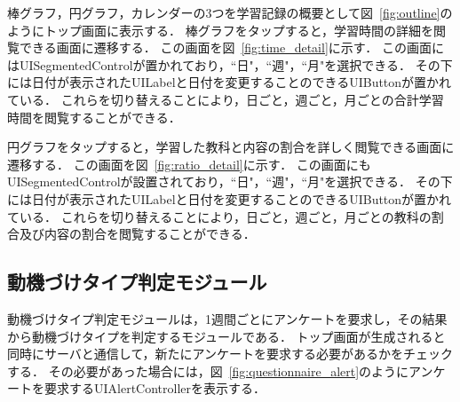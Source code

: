 棒グラフ，円グラフ，カレンダーの3つを学習記録の概要として図~\ref{fig:outline}のようにトップ画面に表示する．
棒グラフをタップすると，学習時間の詳細を閲覧できる画面に遷移する．
この画面を図~\ref{fig:time_detail}に示す．
この画面にはUISegmentedControlが置かれており，``日"，``週"，``月"を選択できる．
その下には日付が表示されたUILabelと日付を変更することのできるUIButtonが置かれている．
これらを切り替えることにより，日ごと，週ごと，月ごとの合計学習時間を閲覧することができる．

円グラフをタップすると，学習した教科と内容の割合を詳しく閲覧できる画面に遷移する．
この画面を図~\ref{fig:ratio_detail}に示す．
この画面にもUISegmentedControlが設置されており，``日"，``週"，``月"を選択できる．
その下には日付が表示されたUILabelと日付を変更することのできるUIButtonが置かれている．
これらを切り替えることにより，日ごと，週ごと，月ごとの教科の割合及び内容の割合を閲覧することができる．

\subsection{動機づけタイプ判定モジュール}

動機づけタイプ判定モジュールは，1週間ごとにアンケートを要求し，その結果から動機づけタイプを判定するモジュールである．
トップ画面が生成されると同時にサーバと通信して，新たにアンケートを要求する必要があるかをチェックする．
その必要があった場合には，図~\ref{fig:questionnaire_alert}のようにアンケートを要求するUIAlertControllerを表示する．

